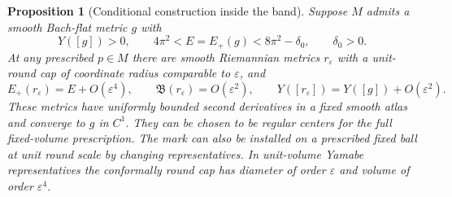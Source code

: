 \documentclass[11pt]{article}
\numberwithin{equation}{section}
\newtheorem{proposition}[theorem]{Proposition}
\theoremstyle{definition}
\theoremstyle{remark}
\begin{document}
\begin{proposition}[Conditional construction inside the band]
\label{msgauge:reverse}
Suppose \(M\) admits a smooth Bach-flat metric \(g\) with
\[
 Y([g])>0,\qquad 4\pi^2<E=E_+(g)<8\pi^2-\delta_0,\qquad \delta_0>0.
\]
At any prescribed \(p\in M\) there are smooth Riemannian metrics
\(r_\varepsilon\) with a unit-round cap of coordinate radius
comparable to \(\varepsilon\), and
\begin{equation}\label{msgauge:splice-rates}
 E_+(r_\varepsilon)=E+O(\varepsilon^4),\qquad
 \mathfrak B(r_\varepsilon)=O(\varepsilon^2),\qquad
 Y([r_\varepsilon])=Y([g])+O(\varepsilon^2).
\end{equation}
These metrics have uniformly bounded second derivatives in a
fixed smooth atlas and converge to \(g\) in \(C^1\).
They can be chosen to be regular centers for the full fixed-volume
prescription. The mark can also be installed on a prescribed
fixed ball at unit round scale by changing representatives.
In unit-volume Yamabe representatives the conformally round
cap has diameter of order \(\varepsilon\) and volume of order
\(\varepsilon^4\).
\end{proposition}
\end{document}
